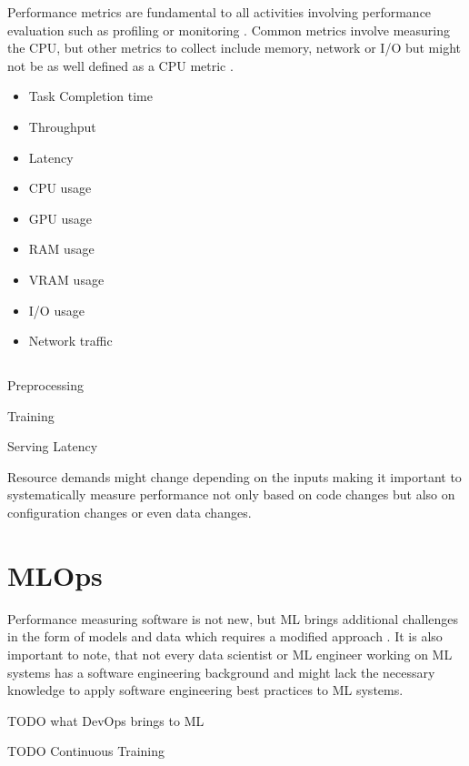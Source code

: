Performance metrics are fundamental to all activities involving performance evaluation such as profiling or monitoring \parencite{brunnertPerformanceorientedDevOpsResearch2015}. Common metrics involve measuring the CPU, but other metrics to collect include memory, network or I/O but might not be as well defined as a CPU metric \parencite{brunnertPerformanceorientedDevOpsResearch2015}. 

\begin{itemize}
    \item Task Completion time
    \item Throughput
    \item Latency
    \item CPU usage
    \item GPU usage
    \item RAM usage
    \item VRAM usage
    \item I/O usage
    \item Network traffic
\end{itemize}

\subsection{}

Preprocessing

Training

Serving Latency

Resource demands might change depending on the inputs \parencite{brunnertPerformanceorientedDevOpsResearch2015} making it important to systematically measure performance not only based on code changes but also on configuration changes or even data changes.

\section{MLOps}
\label{sec:mldevops}

Performance measuring software is not new, but ML brings additional challenges in the form of models and data which requires a modified approach \parencite{breckMLTestScore2017a}. It is also important to note, that not every data scientist or ML engineer working on ML systems has a software engineering background \parencite{finzerDataScienceEducation2013} and might lack the necessary knowledge to apply software engineering best practices to ML systems.

TODO what DevOps brings to ML

TODO Continuous Training
